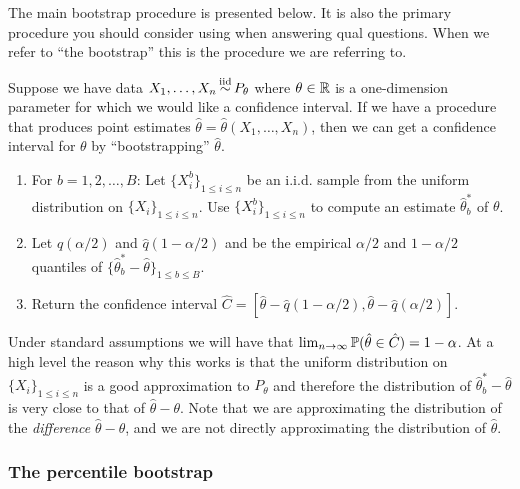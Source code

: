 The main bootstrap procedure is presented below. It is also the primary procedure you should consider using when answering qual questions. When we refer to ``the bootstrap'' this is the procedure we are referring to.

Suppose we have data $X_1,\dots,X_n \simiid P_{\theta}$ where $\theta \in \mathbb{R}$ is a one-dimension parameter for which we would like a confidence interval. If we have a procedure that produces point estimates $\hat{\theta} = \hat{\theta}(X_1,\dots,X_n)$, then we can get a confidence interval for $\theta$ by ``bootstrapping'' $\hat{\theta}$. 
\begin{enumerate}
\item
    For $b=1,2,\dots,B$: Let $\{X^b_i\}_{1 \le i \le n}$ be an i.i.d. sample from the uniform distribution on  $\{X_i\}_{1 \le i \le n}$. Use $\{X^b_i\}_{1 \le i \le n}$ to compute an estimate $\hat{\theta}^*_b$ of $\theta$.
\item
  Let $\hat{q}(\alpha/2)$ and $\hat{q}(1-\alpha/2)$ and be the empirical $\alpha/2$ and $1-\alpha/2$ quantiles of $\{\hat{\theta}^*_b - \hat{\theta}\}_{1 \leq b \leq B}$. 
  \item
  Return the confidence interval $\hat{C} = [\hat{\theta} - \hat{q}(1-\alpha/2), \hat{\theta} - \hat{q}(\alpha/2)]$. 
\end{enumerate}
Under standard assumptions we will have that $\lim_{n \to \infty} \mathbb{P}(\hat{\theta} \in  \hat{C} ) = 1-\alpha$. At a high level the reason why this works is that the uniform distribution on $\{X_i\}_{1 \le i \le n}$  is a good approximation to $P_{\theta}$ and therefore the distribution of $\hat{\theta}^*_b -\hat{\theta}$ is very close to that of $\hat{\theta} - \theta$. Note that we are approximating the distribution of the \emph{difference} $\hat{\theta}-\theta$, and we are not directly approximating the distribution of $\hat{\theta}$. 

\subsubsection*{The percentile bootstrap}

